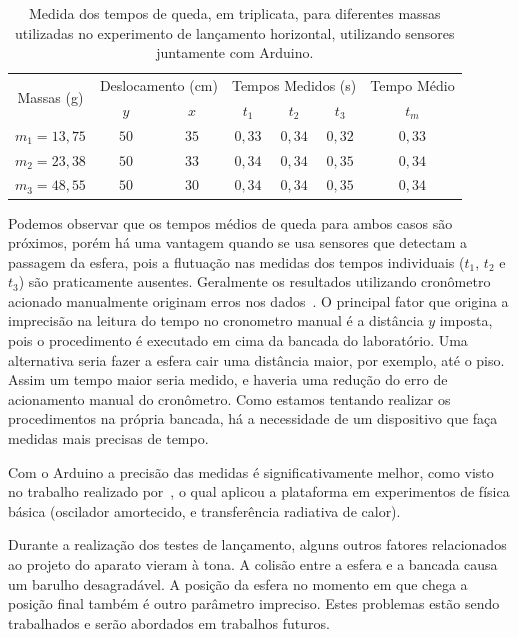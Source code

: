 \documentclass[article,11pt,a4paper]{abntex2}
\begin{document}
\begin{table}[!hbt]
\centering
\begin{tabular}{ccccccc}
\toprule
\multirow{2}{*}{Massas (g)} & \multicolumn{2}{c}{Deslocamento (cm)} & \multicolumn{3}{c}{Tempos Medidos (s)} & Tempo Médio\\
\cmidrule(r){2-7}
& $y$ & $x$ & $t_1$ & $t_2$ & $t_3$ & $t_m$ \\
\midrule
$m_1 = 13,75$ & $50$ & $35$ & $0,33$ & $0,34$ & $0,32$ & $0,33$ \\
$m_2 = 23,38$ & $50$ & $33$ & $0,34$ & $0,34$ & $0,35$ & $0,34$ \\
$m_3 = 48,55$ & $50$ & $30$ & $0,34$ & $0,34$ & $0,35$ & $0,34$ \\
\bottomrule
\end{tabular}
\caption{Medida dos tempos de queda, em triplicata, para diferentes massas utilizadas no experimento de lançamento horizontal, utilizando sensores juntamente com Arduino.}
\label{tab:lancamento_arduino}
\end{table}



Podemos observar que os tempos médios de queda para ambos casos são próximos, porém há uma vantagem quando se usa sensores que detectam a passagem da esfera, pois a flutuação nas medidas dos tempos individuais ($t_1$, $t_2$ e $t_3$) são praticamente ausentes.
Geralmente os resultados utilizando cronômetro acionado manualmente originam erros nos dados~\cite{Andrades_2013}.
O principal fator que origina a imprecisão na leitura do tempo no cronometro manual é a distância $y$ imposta, pois o procedimento é executado em cima da bancada do laboratório.
Uma alternativa seria fazer a esfera cair uma distância maior, por exemplo, até o piso.
Assim um tempo maior seria medido, e haveria uma redução do erro de acionamento manual do cronômetro.
Como estamos tentando realizar os procedimentos na própria bancada, há a necessidade de um dispositivo que faça medidas mais precisas de tempo.


Com o Arduino a precisão das medidas é significativamente melhor, como visto no trabalho realizado por~\textcite{Souza_2011}, o qual aplicou a plataforma em experimentos de física básica (oscilador amortecido, e transferência radiativa de calor).


Durante a realização dos testes de lançamento, alguns outros fatores relacionados ao projeto do aparato vieram à tona.
A colisão entre a esfera e a bancada causa um barulho desagradável.
A posição da esfera no momento em que chega a posição final também é outro parâmetro impreciso. Estes problemas estão sendo trabalhados e serão abordados em trabalhos futuros.
\end{document}
